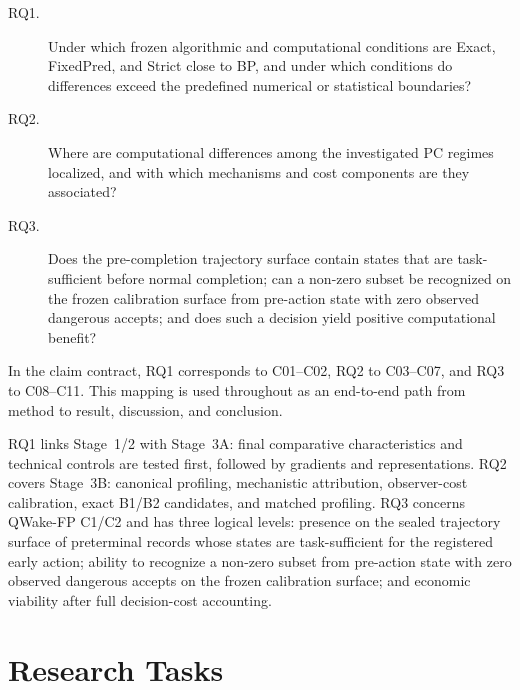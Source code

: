 \begin{description}
  \item[RQ1.] Under which frozen algorithmic and computational conditions are Exact, FixedPred, and Strict close to BP, and under which conditions do differences exceed the predefined numerical or statistical boundaries?
  \item[RQ2.] Where are computational differences among the investigated PC regimes localized, and with which mechanisms and cost components are they associated?
  \item[RQ3.] Does the pre-completion trajectory surface contain states that are task-sufficient before normal completion; can a non-zero subset be recognized on the frozen calibration surface from pre-action state with zero observed dangerous accepts; and does such a decision yield positive computational benefit?
\end{description}

In the claim contract, RQ1 corresponds to C01--C02, RQ2 to C03--C07, and RQ3 to
C08--C11. This mapping is used throughout as an end-to-end path from method to
result, discussion, and conclusion.

RQ1 links Stage~1/2 with Stage~3A: final comparative characteristics and technical
controls are tested first, followed by gradients and representations. RQ2 covers
Stage~3B: canonical profiling, mechanistic attribution, observer-cost calibration,
exact B1/B2 candidates, and matched profiling. RQ3 concerns QWake-FP C1/C2 and has
three logical levels: presence on the sealed trajectory surface of preterminal records
whose states are task-sufficient for the registered early action; ability to recognize
a non-zero subset from pre-action state with zero observed dangerous accepts on the
frozen calibration surface; and economic viability after full decision-cost
accounting.

\section{Research Tasks}

